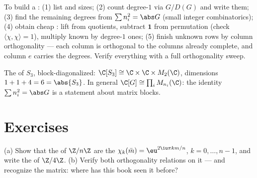 \begin{method}\label{met:b3:representations:table}
To build a : (1) list  and sizes;
(2) count degree-$1$  via $G/D(G)$ and write them; (3)
find the remaining degrees from $\sum n_i^2 = \abs G$ (small
integer combinatorics); (4) obtain cheap : lift from
quotients, subtract $\mathbf 1$ from permutation 
(check $\langle\chi,\chi\rangle = 1$), multiply known 
by degree-$1$ ones; (5) finish unknown rows by column
orthogonality --- each column is orthogonal to the columns
already complete, and column $e$ carries the degrees. Verify
everything with a full orthogonality sweep.
\end{method}

\begin{omfigure}

{\small The  of $S_3$, block-diagonalized:
$\C[S_3] \cong \C \times \C \times M_2(\C)$, dimensions $1 + 1 +
4 = 6 = \abs{S_3}$. In general $\C[G] \cong \prod_i
M_{n_i}(\C)$: the identity $\sum n_i^2 = \abs G$ is a statement
about matrix blocks.}
\end{omfigure}

\section{Exercises}

\begin{exercise}[$\star$]\label{exo:b3:representations:1}
(a) Show that the   of $\Z/n\Z$ are the
$\chi_k(\bar m) = \eu^{2\iu\pi km/n}$, $k = 0, \dots, n-1$, and
write the  of $\Z/4\Z$.
(b) Verify both orthogonality relations on it --- and recognize
the matrix: where has this book seen it before?
\end{exercise}

